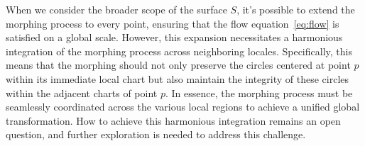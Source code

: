 When we consider the broader scope of the surface \( S \), it's possible to extend the morphing process to every point,
ensuring that the flow equation~\eqref{eq:flow} is satisfied on a global scale.
However, this expansion necessitates a harmonious integration of the morphing process across neighboring locales.
Specifically, this means that the morphing should not only preserve the circles centered at point \( p \) within its immediate local chart
but also maintain the integrity of these circles within the adjacent charts of point \( p \).
In essence, the morphing process must be seamlessly coordinated across the various local regions to achieve a unified global transformation.
How to achieve this harmonious integration remains an open question, and further exploration is needed to address this challenge.
